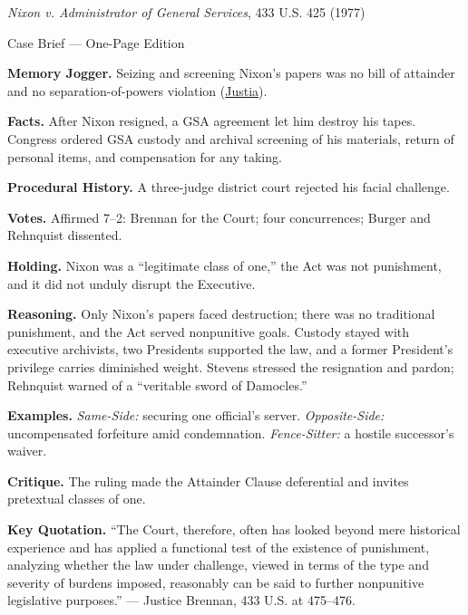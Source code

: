 \documentclass[12pt]{article}
\begin{document}
\begin{center}
{\Large \textit{Nixon v. Administrator of General Services}, 433 U.S. 425 (1977)\par}
\vspace{0.3em}
{\normalsize Case Brief --- One-Page Edition\par}
\end{center}

\textbf{Memory Jogger.} Seizing and screening Nixon's papers was no bill of attainder and no separation-of-powers violation (\href{https://supreme.justia.com/cases/federal/us/433/425/}{Justia}).

\textbf{Facts.} After Nixon resigned, a GSA agreement let him destroy his tapes. Congress ordered GSA custody and archival screening of his materials, return of personal items, and compensation for any taking.

\textbf{Procedural History.} A three-judge district court rejected his facial challenge.

\textbf{Votes.} Affirmed 7--2: Brennan for the Court; four concurrences; Burger and Rehnquist dissented.

\textbf{Holding.} Nixon was a ``legitimate class of one,'' the Act was not punishment, and it did not unduly disrupt the Executive.

\textbf{Reasoning.} Only Nixon's papers faced destruction; there was no traditional punishment, and the Act served nonpunitive goals. Custody stayed with executive archivists, two Presidents supported the law, and a former President's privilege carries diminished weight. Stevens stressed the resignation and pardon; Rehnquist warned of a ``veritable sword of Damocles.''

\textbf{Examples.} \emph{Same-Side:} securing one official's server. \emph{Opposite-Side:} uncompensated forfeiture amid condemnation. \emph{Fence-Sitter:} a hostile successor's waiver.

\textbf{Critique.} The ruling made the Attainder Clause deferential and invites pretextual classes of one.

\textbf{Key Quotation.} ``The Court, therefore, often has looked beyond mere historical experience and has applied a functional test of the existence of punishment, analyzing whether the law under challenge, viewed in terms of the type and severity of burdens imposed, reasonably can be said to further nonpunitive legislative purposes.'' --- Justice Brennan, 433 U.S. at 475--476.
\end{document}
